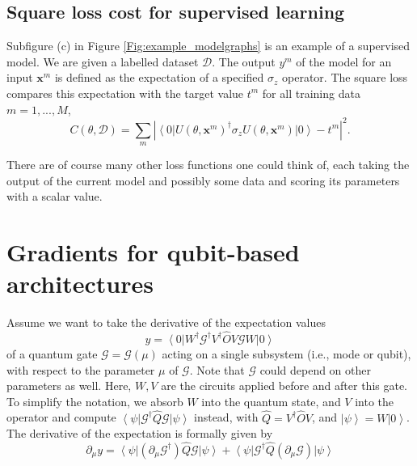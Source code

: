 \documentclass[aps,pra,10pt,twocolumn,groupedaddress,nofootinbib]{revtex4-1}
\theoremstyle{plain}
\newcommand{\ket}[1]{\ensuremath{\left| #1 \right \rangle}}
\newcommand{\bra}[1]{\ensuremath{\left \langle #1 \right |}}
\newcommand{\bx}{\mathbf{x}}
\newcommand{\G}{\mathcal{G}}
\begin{document}
\subsection{Square loss cost for supervised learning}
Subfigure (c) in Figure \ref{Fig:example_modelgraphs} is an example of a supervised model. We are given a labelled dataset $\mathcal{D}$. The output $y^m$ of the model for an input $\bx^m$ is defined as the expectation of a specified $\sigma_z$ operator. The square loss compares this expectation with the target value $t^m$ for all training data $m=1,...,M$,
\[ C(\theta, \mathcal{D}) = \sum_{m} |\bra{0}U(\theta, \bx^m)^{\dagger} \sigma_z U(\theta, \bx^m)\ket{0}-t^m|^2. \]

There are of course many other loss functions one could think of, each taking the output of the current model and possibly some data and scoring its parameters with a scalar value.



%


\clearpage
\appendix


\section{Gradients for qubit-based architectures}

Assume we want to take the derivative of the expectation values
\[ y = \bra{0}W^{\dagger} \G^{\dagger}  V^{\dagger} \hat{O} V \G W \ket{0}\]
of a quantum gate $\G = \G(\mu)$ acting on a single subsystem (i.e., mode or qubit), with respect to the parameter $\mu$ of $\G$. Note that $\G$ could depend on other parameters as well. Here, $W,V$ are the circuits applied before and after this gate. To simplify the notation, we absorb $W$ into the quantum state, and $V$ into the operator and compute $ \bra{\psi} \G^{\dagger}  \hat{Q} \G \ket{\psi}$ instead, with $\hat{Q} = V^{\dagger} \hat{O} V$, and $\ket{\psi}= W \ket{0}$.\\

The derivative of the expectation is formally given by
\begin{equation}
	\partial_{\mu} y = \bra{\psi} ( \partial_{\mu}\G^{\dagger})  \hat{Q} \G \ket{\psi} + \bra{\psi} \G^{\dagger}  \hat{Q}  (\partial_{\mu}\G) \ket{\psi}
	\label{Eq:der_of_exp}
\end{equation}
\end{document}
